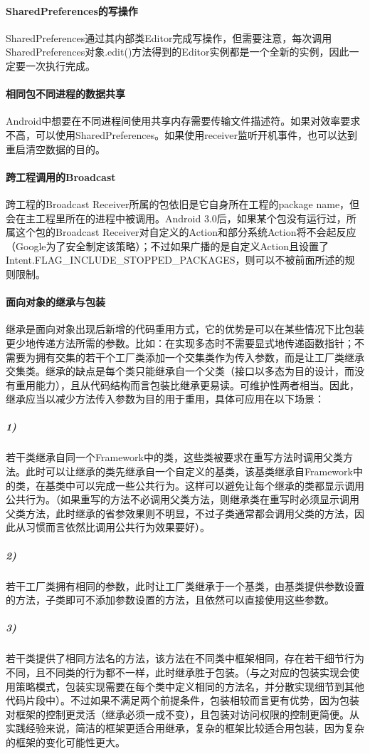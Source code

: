 \documentclass[UTF8]{ctexart}
\begin{document}
    \paragraph{SharedPreferences的写操作}
    SharedPreferences通过其内部类Editor完成写操作，但需要注意，每次调用SharedPreferences对象.edit()方法得到的Editor实例都是一个全新的实例，因此一定要一次执行完成。
    \paragraph{相同包不同进程的数据共享}
    Android中想要在不同进程间使用共享内存需要传输文件描述符。如果对效率要求不高，可以使用SharedPreferences。如果使用receiver监听开机事件，也可以达到重启清空数据的目的。
    \paragraph{跨工程调用的Broadcast}
    跨工程的Broadcast Receiver所属的包依旧是它自身所在工程的package name，但会在主工程里所在的进程中被调用。Android 3.0后，如果某个包没有运行过，所属这个包的Broadcast Receiver对自定义的Action和部分系统Action将不会起反应（Google为了安全制定该策略）；不过如果广播的是自定义Action且设置了Intent.FLAG_INCLUDE_STOPPED_PACKAGES，则可以不被前面所述的规则限制。
    \paragraph{面向对象的继承与包装}
    继承是面向对象出现后新增的代码重用方式，它的优势是可以在某些情况下比包装更少地传递方法所需的参数。比如：在实现多态时不需要显式地传递函数指针；不需要为拥有交集的若干个工厂类添加一个交集类作为传入参数，而是让工厂类继承交集类。继承的缺点是每个类只能继承自一个父类（接口以多态为目的设计，而没有重用能力），且从代码结构而言包装比继承更易读。可维护性两者相当。因此，继承应当以减少方法传入参数为目的用于重用，具体可应用在以下场景：
        \subparagraph{1)} 若干类继承自同一个Framework中的类，这些类被要求在重写方法时调用父类方法。此时可以让继承的类先继承自一个自定义的基类，该基类继承自Framework中的类，在基类中可以完成一些公共行为。这样可以避免让每个继承的类都显示调用公共行为。（如果重写的方法不必调用父类方法，则继承类在重写时必须显示调用父类方法，此时继承的省参效果则不明显，不过子类通常都会调用父类的方法，因此从习惯而言依然比调用公共行为效果要好）。
        \subparagraph{2)} 若干工厂类拥有相同的参数，此时让工厂类继承于一个基类，由基类提供参数设置的方法，子类即可不添加参数设置的方法，且依然可以直接使用这些参数。
        \subparagraph{3)} 若干类提供了相同方法名的方法，该方法在不同类中框架相同，存在若干细节行为不同，且不同类的行为都不一样，此时继承胜于包装。（与之对应的包装实现会使用策略模式，包装实现需要在每个类中定义相同的方法名，并分散实现细节到其他代码片段中）。不过如果不满足两个前提条件，包装相较而言更有优势，因为包装对框架的控制更灵活（继承必须一成不变），且包装对访问权限的控制更简便。从实践经验来说，简洁的框架更适合用继承，复杂的框架比较适合用包装，因为复杂的框架的变化可能性更大。
\end{document}
